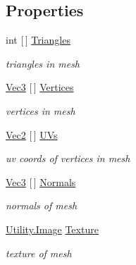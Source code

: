 \subsection*{Properties}
\begin{DoxyCompactItemize}
\item 
int \mbox{[}$\,$\mbox{]} \mbox{\hyperlink{class_virt_muse_web_1_1_utility_1_1_unity_mesh_data_a85eca41f6b09eda97803c04857d71b35}{Triangles}}
\begin{DoxyCompactList}\small\item\em triangles in mesh \end{DoxyCompactList}\item 
\mbox{\hyperlink{class_virt_muse_web_1_1_utility_1_1_vec3}{Vec3}} \mbox{[}$\,$\mbox{]} \mbox{\hyperlink{class_virt_muse_web_1_1_utility_1_1_unity_mesh_data_ab521629085e0dc212a7a32268c3c1c65}{Vertices}}
\begin{DoxyCompactList}\small\item\em vertices in mesh \end{DoxyCompactList}\item 
\mbox{\hyperlink{class_virt_muse_web_1_1_utility_1_1_vec2}{Vec2}} \mbox{[}$\,$\mbox{]} \mbox{\hyperlink{class_virt_muse_web_1_1_utility_1_1_unity_mesh_data_a790f45fd753b0c2e9294da66be08ee30}{U\+Vs}}
\begin{DoxyCompactList}\small\item\em uv coords of vertices in mesh \end{DoxyCompactList}\item 
\mbox{\hyperlink{class_virt_muse_web_1_1_utility_1_1_vec3}{Vec3}} \mbox{[}$\,$\mbox{]} \mbox{\hyperlink{class_virt_muse_web_1_1_utility_1_1_unity_mesh_data_a2b5b5618a3261799a035240c970526d4}{Normals}}
\begin{DoxyCompactList}\small\item\em normals of mesh \end{DoxyCompactList}\item 
\mbox{\hyperlink{class_virt_muse_web_1_1_utility_1_1_image}{Utility.\+Image}} \mbox{\hyperlink{class_virt_muse_web_1_1_utility_1_1_unity_mesh_data_a47b7950c5751051cddef6b3d6ee9d2cd}{Texture}}
\begin{DoxyCompactList}\small\item\em texture of mesh \end{DoxyCompactList}\end{DoxyCompactItemize}
